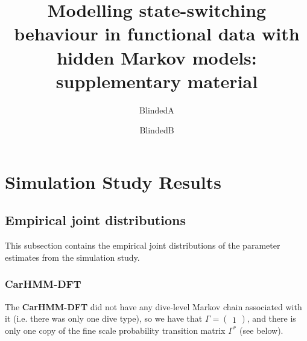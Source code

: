 \documentclass[12pt]{TD-CJS}
\begin{document}

\renewcommand{\eqref}[1]{(\ref{#1})}
\newcommand{\mb}[1]{\mathbf{#1}}
\newcommand{\mbb}[1]{\mathbb{#1}}
\newcommand{\mt}[1]{\mathrm{#1}}
\newcommand{\rv}{random variable}
\newcommand{\newblock}{}


\title[]{Modelling state-switching behaviour in functional data with hidden Markov models: supplementary material}%
\author{BlindedA\thanksref{*}}
\author{BlindedB}


\makechaptertitle

\section{Simulation Study Results}

\subsection{Empirical joint distributions}

This subsection contains the empirical joint distributions of the parameter estimates from the simulation study.

\subsubsection{\textbf{CarHMM-DFT}}

The \textbf{CarHMM-DFT} did not have any dive-level Markov chain associated with it (i.e. there was only one dive type), so we have that $\Gamma = \begin{pmatrix} 1 \end{pmatrix}$, and there is only one copy of the fine scale probability transition matrix $\Gamma^*$ (see below).
\end{document}
